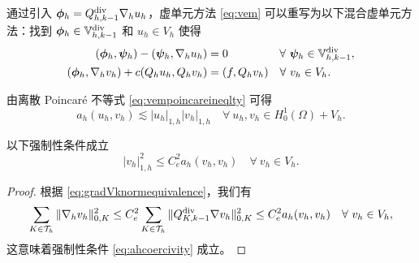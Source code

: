 \begin{remark}\rm
通过引入 $\boldsymbol{\phi}_h=Q_{h,k-1}^{\operatorname{div}}\nabla_h u_h$，虚单元方法
\eqref{eq:vem} 可以重写为以下混合虚单元方法：找到
$\boldsymbol{\phi}_h\in\mathbb{V}_{h,k-1}^{\rm div}$ 和 $u_h\in V_h$ 使得
\begin{equation*}
\begin{aligned}
(\boldsymbol{\phi}_h, \boldsymbol{\psi}_h) - (\boldsymbol{\psi}_h, \nabla_h u_h)&=0 \quad\quad\quad\quad\;\;\forall~\boldsymbol{\psi}_h\in\mathbb{V}_{h,k-1}^{\rm div},\\
(\boldsymbol{\phi}_h, \nabla_h v_h)+c(Q_hu_h, Q_hv_h)&=(f, Q_hv_h)\quad\forall~v_h\in V_h.
\end{aligned}
\end{equation*}
\end{remark}



由离散 Poincaré 不等式 \eqref{eq:vempoincareineqlty} 可得
\begin{equation}\label{eq:ahbounedness}
a_h(u_h, v_h)\lesssim |u_h|_{1,h}|v_h|_{1,h}\quad\forall~u_h,v_h\in H_0^1(\Omega)+V_h.
\end{equation}
\begin{lemma}
以下强制性条件成立
\begin{equation}\label{eq:ahcoercivity}
|v_h|_{1,h}^2\leq C_e^2 a_h(v_h, v_h)\quad\forall~v_h\in V_h.
\end{equation}
\end{lemma}
\begin{proof}
根据 \eqref{eq:gradVknormequivalence}，我们有
\[
\sum_{K\in\mathcal T_h}\|\nabla_h v_h\|_{0,K}^2\leq C_e^2 \sum_{K\in\mathcal T_h}\|Q_{K,k-1}^{\operatorname{div}}\nabla v_h\|_{0,K}^2\leq C_e^2a_h(v_h, v_h)\quad\forall~v_h\in V_h,
\]
这意味着强制性条件 \eqref{eq:ahcoercivity} 成立。
\end{proof}


